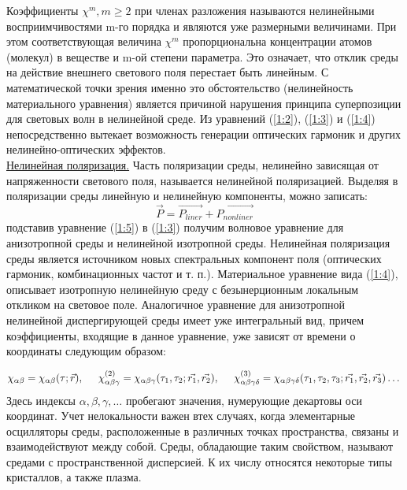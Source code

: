 Коэффициенты $\chi^{m}, m \ge 2$ при членах разложения называются нелинейными восприимчивостями m-го порядка и являются уже размерными величинами. При этом соответствующая величина $\chi^{m}$ пропорциональна концентрации атомов (молекул) в веществе и m-ой степени параметра. Это означает, что отклик среды на действие внешнего светового поля перестает быть линейным.  С математической точки зрения именно это обстоятельство (нелинейность материального уравнения) является причиной нарушения принципа суперпозиции для световых волн в нелинейной среде. Из уравнений (\ref{1:2}), (\ref{1:3}) и (\ref{1:4}) непосредственно вытекает возможность генерации оптических гармоник и других нелинейно-оптических эффектов. 
\\\underline{Нелинейная поляризация.} Часть поляризации среды, нелинейно зависящая от напряженности светового поля, называется нелинейной поляризацией.
Выделяя в поляризации среды линейную и нелинейную компоненты, можно
записать:
\begin{equation}\label{1:5}
\vec{P} = \vec{P_{liner}} + \vec{P_{nonliner}}
\end{equation}
подставив уравнение  (\ref{1:5}) в  (\ref{1:3}) получим волновое уравнение для анизотропной среды и нелинейной изотропной среды. Нелинейная поляризация среды является источником новых спектральных компонент поля
(оптических гармоник, комбинационных частот и т. п.). Материальное уравнение вида  (\ref{1:4}), описывает изотропную нелинейную среду с безынерционным локальным откликом на световое поле. Аналогичное
уравнение для анизотропной нелинейной диспергирующей среды имеет уже интегральный вид, причем коэффициенты, входящие в данное уравнение, уже зависят от времени о координаты следующим образом:

 \begin{equation}\label{1:6}
\chi_{\alpha \beta} =  \chi_{\alpha \beta}(\tau ; \vec{r}),
\hspace{5mm}
\chi_{\alpha\beta\gamma}^{(2)}= \chi_{\alpha\beta\gamma}(\tau_{1},\tau_{2};\vec{r_{1}}, \vec{r_{2} }),
\hspace{5mm}
\chi_{\alpha\beta\gamma\delta}^{(3)} = \chi_{\alpha\beta\gamma\delta}(\tau_{1},\tau_{2},\tau_{3};\vec{r_{1}}, \vec{r_{2}}, \vec{r_{3} })
\dots
\end{equation}
Здесь индексы $\alpha, \beta, \gamma, \dots$ пробегают значения, нумерующие декартовы оси координат. Учет нелокальности важен втех случаях, когда элементарные осцилляторы среды, расположенные в различных точках пространства, связаны и взаимодействуют между собой. Среды, обладающие таким свойством, называют средами с пространственной дисперсией. К их числу относятся некоторые типы кристаллов, а также плазма.
